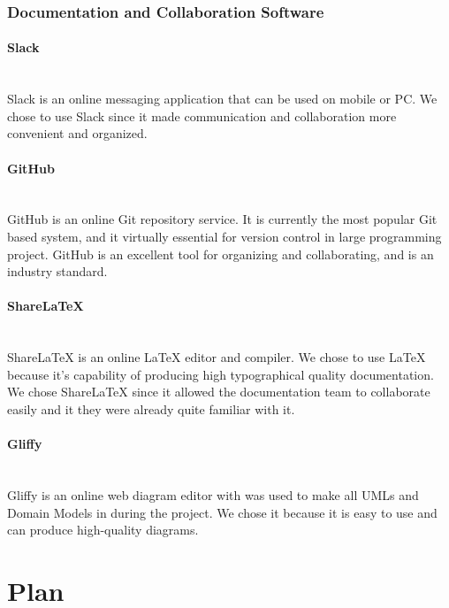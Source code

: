 \documentclass[12pt]{article}
\begin{document}
\subsubsection{Documentation and Collaboration Software}
\paragraph*{Slack}~\\
Slack is an online messaging application that can be used on mobile or PC. We chose to use Slack since it made communication and collaboration more convenient and organized.
%
\paragraph*{GitHub}~\\
GitHub is an online Git repository service. It is currently the most popular Git based system, and it virtually essential for version control in large programming project. GitHub is an excellent tool for organizing and collaborating, and is an industry standard.
%
\paragraph*{ShareLaTeX}~\\
ShareLaTeX is an online LaTeX editor and compiler. We chose to use LaTeX because it's capability of producing high typographical quality documentation. We chose ShareLaTeX since it allowed the documentation team to collaborate easily and it they were already quite familiar with it. 
%
\paragraph*{Gliffy}~\\
Gliffy is an online web diagram editor with was used to make all UMLs and Domain Models in during the project. We chose it because it is easy to use and can produce high-quality diagrams.
%
\vfill
\newpage
\section{Plan}
\end{document}
